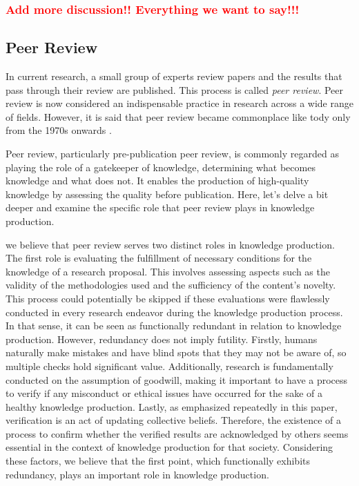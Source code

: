 \documentclass{book}
\begin{document}
\subsubsection{\textcolor{red}{Add more discussion!! Everything we want to say!!!}}

\subsection{Peer Review}
In current research, a small group of experts review papers and the results that pass through their review are published. This process is called \textit{peer review}. Peer review is now considered an indispensable practice in research across a wide range of fields. However, it is said that peer review became commonplace like tody only from the 1970s onwards \cite{baldwin2018scientific}.

Peer review, particularly pre-publication peer review, is commonly regarded as playing the role of a gatekeeper of knowledge, determining what becomes knowledge and what does not. It enables the production of high-quality knowledge by assessing the quality before publication. Here, let's delve a bit deeper and examine the specific role that peer review plays in knowledge production.

we believe that peer review serves two distinct roles in knowledge production. The first role is evaluating the fulfillment of necessary conditions for the knowledge of a research proposal. This involves assessing aspects such as the validity of the methodologies used and the sufficiency of the content's novelty. This process could potentially be skipped if these evaluations were flawlessly conducted in every research endeavor during the knowledge production process. In that sense, it can be seen as functionally redundant in relation to knowledge production. However, redundancy does not imply futility. Firstly, humans naturally make mistakes and have blind spots that they may not be aware of, so multiple checks hold significant value. Additionally, research is fundamentally conducted on the assumption of goodwill, making it important to have a process to verify if any misconduct or ethical issues have occurred for the sake of a healthy knowledge production. Lastly, as emphasized repeatedly in this paper, verification is an act of updating collective beliefs. Therefore, the existence of a process to confirm whether the verified results are acknowledged by others seems essential in the context of knowledge production for that society. Considering these factors, we believe that the first point, which functionally exhibits redundancy, plays an important role in knowledge production.
\end{document}
